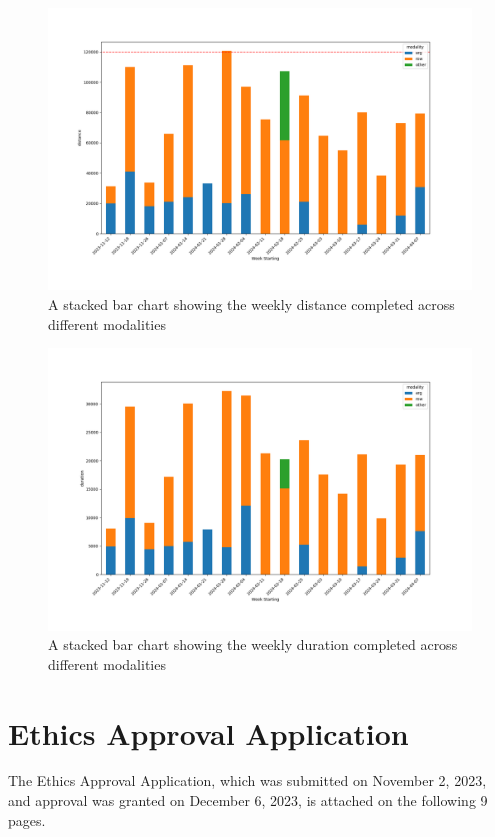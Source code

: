 \begin{figure}[!hp]
  \centering
  \includegraphics[width=\linewidth]{figures/distanceVsMod.png}
  \captionsetup{justification=centering}
  \caption*{\label{fig:app_distanceVsMod}A stacked bar chart showing the weekly distance completed across different modalities}
\end{figure}
\begin{figure}[!hp]
  \centering
  \includegraphics[width=\linewidth]{figures/durationVsMod.png}
  \captionsetup{justification=centering}
  \caption*{\label{fig:app_durationVsMod}A stacked bar chart showing the weekly duration completed across different modalities}
\end{figure}


\newpage
\section{\label{sec:ethics-approval-application}Ethics Approval Application}
The Ethics Approval Application, which was submitted on November 2, 2023, and approval was granted on December 6, 2023, is attached on the following 9 pages.
